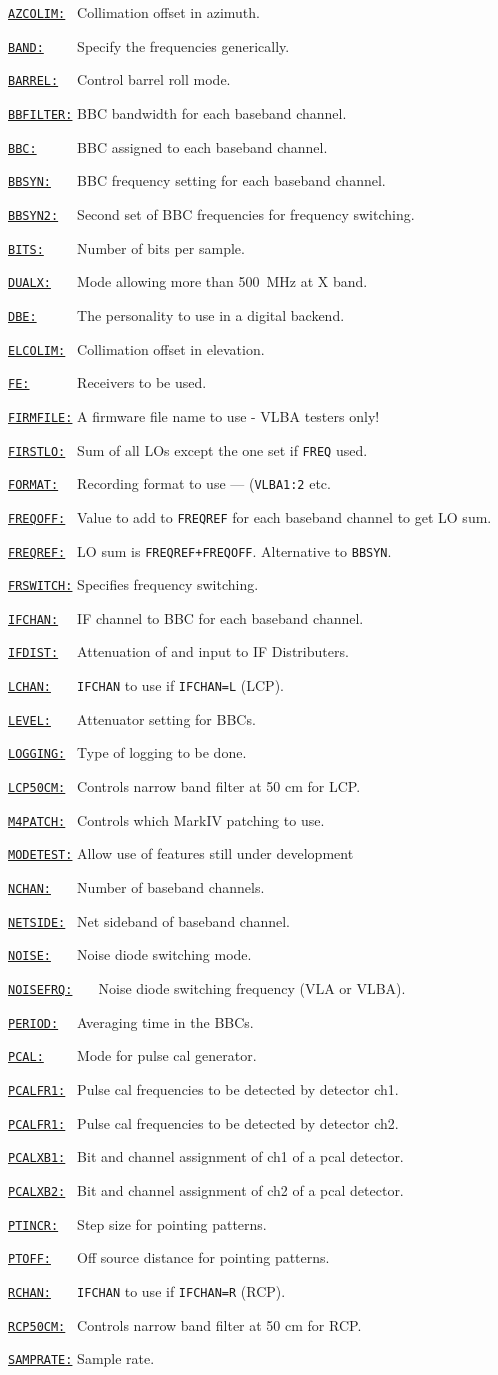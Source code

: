 \documentclass{report}
\newcommand{\htls}[2]%
{\item
  \hyperref[SP:#1]{{\tt #1:}}{\tt #2}%
}
\newcommand{\htlt}[3]%
{\item
  \hyperref[SP:#2]{{\tt #1:}}{\tt #3}%
}
\begin{document}
\begin{list}{~}{\parsep 0em  \itemsep 0em }
\htls{AZCOLIM}{~} Collimation offset in azimuth.
\htls{BAND}{~~~~} Specify the frequencies generically.
\htls{BARREL}{~~} Control barrel roll mode.
\htls{BBFILTER}{} BBC bandwidth for each baseband channel.
\htls{BBC}{~~~~~} BBC assigned to each baseband channel.
\htls{BBSYN}{~~~} BBC frequency setting for each baseband channel.
\htls{BBSYN2}{~~} Second set of BBC frequencies for frequency switching.
\htls{BITS}{~~~~} Number of bits per sample.
\htls{DUALX}{~~~} Mode allowing more than 500~MHz at X band.
\htls{DBE}{~~~~~} The personality to use in a digital backend.
\htls{ELCOLIM}{~} Collimation offset in elevation.
\htls{FE}{~~~~~~} Receivers to be used.
\htls{FIRMFILE}{} A firmware file name to use - VLBA testers only!
\htls{FIRSTLO}{~} Sum of all LOs except the one set if {\tt FREQ} used.
\htls{FORMAT}{~~} Recording format to use --- ({\tt VLBA1:2} etc.
\htls{FREQOFF}{~} Value to add to {\tt FREQREF} for each
                        baseband channel to get LO sum.
\htls{FREQREF}{~} LO sum is {\tt FREQREF+FREQOFF}. Alternative
                        to {\tt BBSYN}.
\htls{FRSWITCH}{} Specifies frequency switching.
\htls{IFCHAN}{~~} IF channel to BBC for each baseband channel.
\htls{IFDIST}{~~} Attenuation of and input to IF Distributers.
\htls{LCHAN}{~~~} {\tt IFCHAN} to use if {\tt IFCHAN=L} (LCP).
\htls{LEVEL}{~~~} Attenuator setting for BBCs.
\htls{LOGGING}{~} Type of logging to be done.
\htls{LCP50CM}{~} Controls narrow band filter at 50 cm for LCP.
\htls{M4PATCH}{~} Controls which MarkIV patching to use.
\htls{MODETEST}{} Allow use of features still under development
\htls{NCHAN}{~~~} Number of baseband channels.
\htls{NETSIDE}{~} Net sideband of baseband channel.
\htls{NOISE}{~~~} Noise diode switching mode.
\htls{NOISEFRQ}{~~~} Noise diode switching frequency (VLA or VLBA).
\htls{PERIOD}{~~} Averaging time in the BBCs.
\htls{PCAL}{~~~~} Mode for pulse cal generator.
\htls{PCALFR1}{~} Pulse cal frequencies to be detected by detector ch1.
\htlt{PCALFR1}{PCALFR1}{~} Pulse cal frequencies to be detected by
                  detector ch2.
\htls{PCALXB1}{~} Bit and channel assignment of ch1 of a pcal detector.
\htlt{PCALXB2}{PCALXB1}{~} Bit and channel assignment of ch2 of a pcal
                  detector.
\htls{PTINCR}{~~} Step size for pointing patterns.
\htls{PTOFF}{~~~} Off source distance for pointing patterns.
\htlt{RCHAN}{LCHAN}{~~~} {\tt IFCHAN} to use if {\tt IFCHAN=R} (RCP).
\htlt{RCP50CM}{LCP50CM}{~} Controls narrow band filter at 50 cm for RCP.
\htls{SAMPRATE}{} Sample rate.

\end{list}
\end{document}
